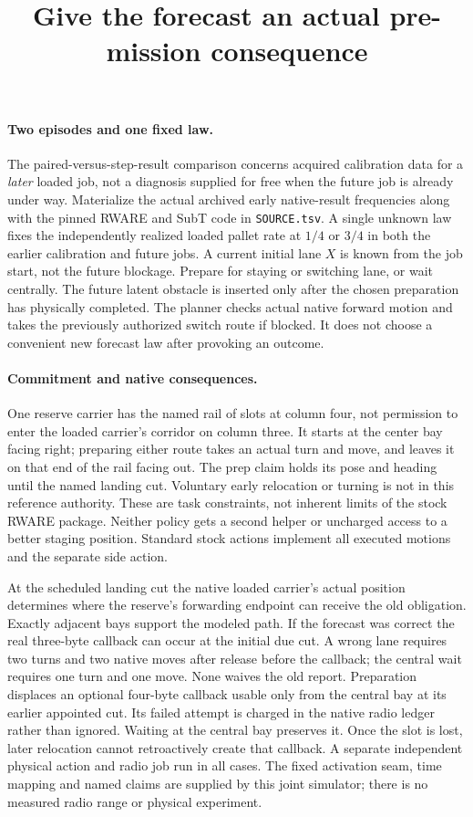 \documentclass{article}
\title{Give the forecast an actual pre-mission consequence}
\date{}
\begin{document}
\maketitle

\paragraph{Two episodes and one fixed law.}
The paired-versus-step-result comparison concerns acquired
calibration data for a \emph{later} loaded job, not a diagnosis
supplied for free when the future job is already under way.
Materialize the actual archived early native-result frequencies
along with the pinned RWARE and SubT code in \verb|SOURCE.tsv|.
A single unknown law fixes the independently realized loaded
pallet rate at $1/4$ or $3/4$ in both the earlier calibration and
future jobs. A current initial lane $X$ is known from the job
start, not the future blockage. Prepare for staying or switching
lane, or wait centrally. The future latent obstacle is inserted
only after the chosen preparation has physically completed.
The planner checks actual native forward motion and takes the
previously authorized switch route if blocked. It does not
choose a convenient new forecast law after provoking an outcome.

\paragraph{Commitment and native consequences.}
One reserve carrier has the named rail of slots at column four,
not permission to enter the loaded carrier's corridor on column
three. It starts at the center bay facing right; preparing either
route takes an actual turn and move, and leaves it on that end
of the rail facing out. The prep claim holds its pose and heading
until the named landing cut. Voluntary early relocation or turning
is not in this reference authority. These are task constraints,
not inherent limits of the stock RWARE package. Neither policy
gets a second helper or uncharged access to a better staging
position. Standard stock actions implement all executed motions
and the separate side action.

At the scheduled landing cut the native loaded carrier's actual
position determines where the reserve's forwarding endpoint can
receive the old obligation. Exactly adjacent bays support the
modeled path. If the forecast was correct the real three-byte
callback can occur at the initial due cut. A wrong lane requires
two turns and two native moves after release before the callback;
the central wait requires one turn and one move. None waives
the old report. Preparation displaces an optional four-byte
callback usable only from the central bay at its earlier appointed
cut. Its failed attempt is charged in the native radio ledger
rather than ignored. Waiting at the central bay preserves it.
Once the slot is lost, later relocation cannot retroactively
create that callback. A separate independent physical action
and radio job run in all cases. The fixed activation seam, time
mapping and named claims are supplied by this joint simulator;
there is no measured radio range or physical experiment.
\end{document}
